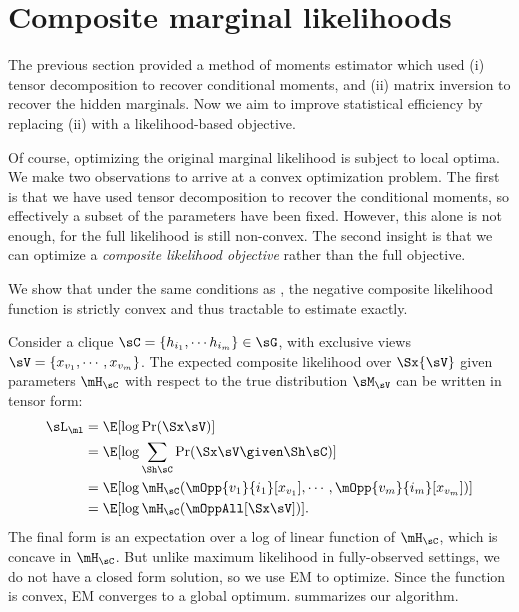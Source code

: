 \section{Composite marginal likelihoods}
\label{sec:piecewise}

The previous section provided a method of moments estimator
which used (i) tensor decomposition to recover conditional moments,
and (ii) matrix inversion to recover the hidden marginals.
Now we aim to improve statistical efficiency by replacing (ii) with a likelihood-based objective.

Of course, optimizing the original marginal likelihood is subject to local optima.
We make two observations to arrive at a convex optimization problem.
The first is that we have used tensor decomposition to recover the conditional moments,
so effectively a subset of the parameters have been fixed.
However, this alone is not enough, for the full likelihood is still non-convex.
The second insight is that we can optimize a \emph{composite likelihood objective} \cite{lindsay88composite}
rather than the full objective.

We show that under the same conditions as , the
  negative composite likelihood function is strictly convex and thus
  tractable to estimate exactly.

Consider a clique $\sC = \{h_{i_1}, \cdots h_{i_m}\} \in \sG$, with
  exclusive views $\sV = \{x_{v_1}, \cdots, x_{v_m}\}$. 
The expected composite likelihood over $\Sx{\sV}$ given parameters $\mH_\sC$
with respect to the true distribution $\sM_\sV$ can be written in tensor form:
\begin{align*}
  \sL_\ml %
  &= \E[\log \Pr( \Sx \sV )] \\
  &= \E[\log \sum_{\Sh \sC} \Pr( \Sx \sV \given \Sh \sC )] \\
  &= \E[\log \mH_\sC(\mOpp{v_1}{i_1} [x_{v_1}], \cdots, \mOpp{v_m}{i_m} [x_{v_m}])] \\
  &= \E[\log \mH_\sC(\mOppAll[\Sx\sV])].
\end{align*}
The final form is an expectation over a log of linear function of $\mH_\sC$, which is concave in
$\mH_\sC$.  But unlike maximum likelihood in fully-observed settings,
we do not have a closed form solution, so we use EM to optimize.
Since the function is convex, EM converges to a global optimum.
 summarizes our algorithm.


